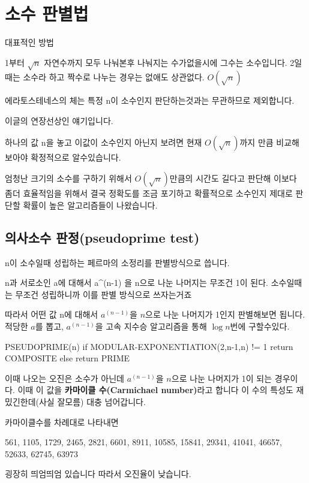\section{소수 판별법}

대표적인 방법

 1부터 $\sqrt{n}$ 자연수까지 모두 나눠본후 나눠지는 수가없을시에 그수는 소수입니다. 2일때는 소수라 하고 짝수로 나누는 경우는 없애도 상관없다.
$O(\sqrt{n})$

에라토스테네스의 체는 특정 n이 소수인지 판단하는것과는 무관하므로 제외합니다.


이글의 연장선상인 얘기입니다.

하나의 값 n을 놓고 이값이 소수인지 아닌지 보려면 현재 $O(\sqrt{n})$까지 만큼 비교해 보아야 확정적으로 알수있습니다.

엄청난 크기의 소수를 구하기 위해서 $O(\sqrt{n})$만큼의 시간도 길다고 판단해
이보다 좀더 효율적임을 위해서 결국 정확도를 조금 포기하고 확률적으로 소수인지 제대로 판단할 확률이 높은 알고리즘들이 나왔습니다.

\subsection{의사소수 판정(pseudoprime test)}

n이 소수일때 성립하는 페르마의 소정리를 판별방식으로 씁니다.

n과 서로소인 a에 대해서 a^(n-1) 을 n으로 나눈 나머지는 무조건 1이 된다. 소수일때는 무조건 성립하니까 이를 판별 방식으로 쓰자는거죠

따라서 어떤 값 n에 대해서 $a^(n-1)$을 $n$으로 나눈 나머지가 1인지 판별해보면 됩니다.
적당한 $a$를 뽑고, $a^(n-1)$을
고속 지수승 알고리즘을 통해 $\log{n}$번에 구할수있다.

\begin{listing}[style = CStyle]
PSEUDOPRIME(n)
    if MODULAR-EXPONENTIATION(2,n-1,n) != 1
        return COMPOSITE
    else return PRIME
\end{listing}



이때 나오는 오진은 소수가 아닌데 $a^(n-1)$을 $n$으로 나눈 나머지가 1이 되는 경우이다.
이때 이 값을 \textbf{카마이클 수(Carmichael number)}라고 합니다 이 수의 특성도 재밌긴한데(사실 잘모름) 대충 넘어갑니다.

카마이클수를 차례대로 나타내면

561, 1105, 1729, 2465, 2821, 6601, 8911, 10585, 15841, 29341, 41041, 46657, 52633, 62745, 63973

굉장히 띄엄띄엄 있습니다 따라서 오진율이 낮습니다.




